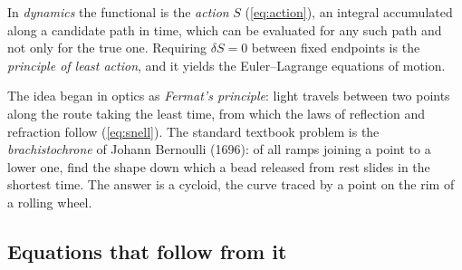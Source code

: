         In \emph{dynamics} the functional is the \emph{action} $S$ (\cref{eq:action}), an integral accumulated along a candidate path in time, which can be evaluated for any such path and not only for the true one. Requiring $\delta S = 0$ between fixed endpoints is the \emph{principle of least action}, and it yields the Euler--Lagrange equations of motion.

        The idea began in optics as \emph{Fermat's principle}: light travels between two points along the route taking the least time, from which the laws of reflection and refraction follow (\cref{eq:snell}). The standard textbook problem is the \emph{brachistochrone} of Johann Bernoulli (1696): of all ramps joining a point to a lower one, find the shape down which a bead released from rest slides in the shortest time. The answer is a cycloid, the curve traced by a point on the rim of a rolling wheel.

    \subsection{Equations that follow from it}

